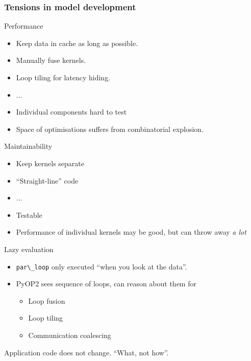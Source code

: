 \documentclass[presentation]{beamer}
\begin{document}
\begin{frame}[allowframebreaks]
  \frametitle{Tensions in model development}

  \begin{block}{Performance}
    \begin{itemize}
    \item Keep data in cache as long as possible.  
    \item Manually fuse kernels.
    \item Loop tiling for latency hiding.
    \item ...
    \item Individual components hard to test
    \item Space of optimisations suffers from combinatorial
      explosion.
    \end{itemize}
  \end{block}

\pagebreak
  \begin{block}{Maintainability}
    \begin{itemize}
    \item Keep kernels separate
    \item ``Straight-line'' code
    \item ...
    \item Testable
    \item Performance of individual kernels may be good, but can throw
      away \emph{a lot}
    \end{itemize}
  \end{block}

\end{frame}
\begin{frame}
  \begin{exampleblock}{Lazy evaluation}
    \begin{itemize}
    \item \verb~par\_loop~ only executed ``when you look at the
      data''.
    \item PyOP2 sees sequence of loops, can reason about them for
      \begin{itemize}
      \item Loop fusion
      \item Loop tiling
      \item Communication coalescing
      \end{itemize}
    \end{itemize}
  \end{exampleblock}

  Application code does not change.  ``What, not how''.
\end{frame}
\end{document}
